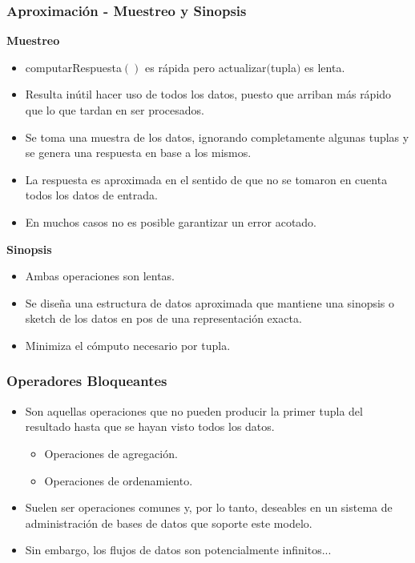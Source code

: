 \begin{frame}
\frametitle{Aproximación - Muestreo y Sinopsis}
\textbf{Muestreo}
\begin{itemize}
\item computarRespuesta$()$ es rápida pero actualizar$($tupla$)$ es lenta.
\item Resulta inútil hacer uso de todos los datos, puesto que arriban más rápido que lo que tardan en ser procesados.
\item Se toma una muestra de los datos, ignorando completamente algunas tuplas y se genera una respuesta en base a los mismos.
\item La respuesta es aproximada en el sentido de que no se tomaron en cuenta todos los datos de entrada.
\item En muchos casos no es posible garantizar un error acotado.
\end{itemize}
\textbf{Sinopsis}
\begin{itemize}
\item Ambas operaciones son lentas.
\item Se diseña una estructura de datos aproximada que mantiene una sinopsis o sketch de los datos en pos de una representación exacta.
\item Minimiza el cómputo necesario por tupla.
\end{itemize}
\end{frame}

\begin{frame}
\frametitle{Operadores Bloqueantes}
\begin{itemize}
\item Son aquellas operaciones que no pueden producir la primer tupla del resultado hasta que se hayan visto todos los datos.
\begin{itemize}
\item Operaciones de agregación.
\item Operaciones de ordenamiento.
\end{itemize}
\item Suelen ser operaciones comunes y, por lo tanto, deseables en un sistema de administración de bases de datos que soporte este modelo.
\item Sin embargo, los flujos de datos son potencialmente infinitos...
\end{itemize}
\end{frame}

